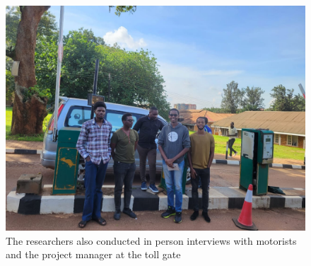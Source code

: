 \begin{appendices}
    \begin{figure}
        \begin{center}
            \includegraphics[scale = 0.3]{images/rizz.jpeg}
            \caption{The researchers also conducted in person interviews with motorists and the project manager at the toll gate}
        \end{center}
    \end{figure}
\end{appendices}